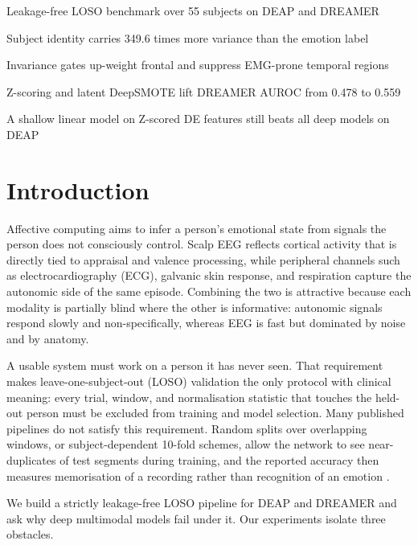 \documentclass[a4paper,fleqn]{cas-sc}
\begin{document}
\begin{highlights}
\item Leakage-free LOSO benchmark over 55 subjects on DEAP and DREAMER
\item Subject identity carries 349.6 times more variance than the emotion label
\item Invariance gates up-weight frontal and suppress EMG-prone temporal regions
\item Z-scoring and latent DeepSMOTE lift DREAMER AUROC from 0.478 to 0.559
\item A shallow linear model on Z-scored DE features still beats all deep models on DEAP
\end{highlights}

\section{Introduction}
\label{sec:intro}

Affective computing aims to infer a person's emotional state from signals the person does not consciously control. Scalp EEG reflects cortical activity that is directly tied to appraisal and valence processing, while peripheral channels such as electrocardiography (ECG), galvanic skin response, and respiration capture the autonomic side of the same episode. Combining the two is attractive because each modality is partially blind where the other is informative: autonomic signals respond slowly and non-specifically, whereas EEG is fast but dominated by noise and by anatomy.

A usable system must work on a person it has never seen. That requirement makes leave-one-subject-out (LOSO) validation the only protocol with clinical meaning: every trial, window, and normalisation statistic that touches the held-out person must be excluded from training and model selection. Many published pipelines do not satisfy this requirement. Random splits over overlapping windows, or subject-dependent 10-fold schemes, allow the network to see near-duplicates of test segments during training, and the reported accuracy then measures memorisation of a recording rather than recognition of an emotion \citep{li2022tutorial}.

We build a strictly leakage-free LOSO pipeline for DEAP \citep{koelstra2012deap} and DREAMER \citep{katsigiannis2018dreamer} and ask why deep multimodal models fail under it. Our experiments isolate three obstacles.
\end{document}
